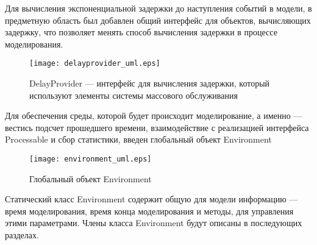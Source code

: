 Для вычисления экспоненциальной задержки до наступления событий в модели, в предметную область был добавлен общий интерфейс для объектов, вычисляющих задержку, что позволяет менять способ вычисления задержки в процессе моделирования.
\begin{figure}[H]
	\centering
	\texttt{[image: delayprovider\_uml.eps]}
	\caption{DelayProvider --- интерфейс для вычисления задержки, который используют элементы системы массового обслуживания}
	\label{delayprovider_uml}
\end{figure}

Для обеспечения среды, которой будет происходит моделирование, а именно --- вестись подсчет прошедшего времени, взаимодействие с реализацией интерфейса Processable и сбор статистики, введен глобальный объект Environment
\begin{figure}[H]
	\centering
	\texttt{[image: environment\_uml.eps]}
	\caption{Глобальный объект Environment}
	\label{environment_uml}
\end{figure}

Статический класс Environment содержит общую для модели информацию --- время моделирования, время конца моделирования и методы, для управления этими параметрами. 
Члены класса Environment будут описаны в последующих разделах.

